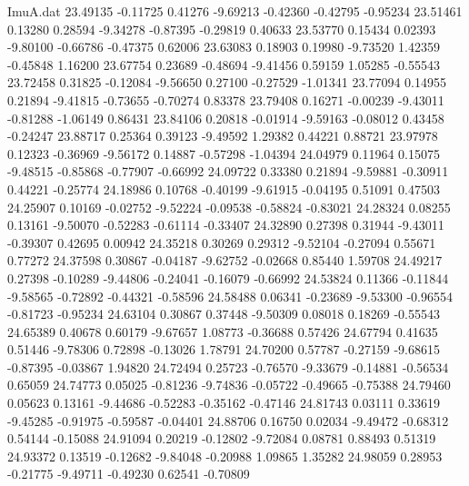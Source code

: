 \begin{filecontents}{ImuA.dat}
  23.49135   -0.11725    0.41276   -9.69213   -0.42360   -0.42795   -0.95234
  23.51461    0.13280    0.28594   -9.34278   -0.87395   -0.29819    0.40633
  23.53770    0.15434    0.02393   -9.80100   -0.66786   -0.47375    0.62006
  23.63083    0.18903    0.19980   -9.73520    1.42359   -0.45848    1.16200
  23.67754    0.23689   -0.48694   -9.41456    0.59159    1.05285   -0.55543
  23.72458    0.31825   -0.12084   -9.56650    0.27100   -0.27529   -1.01341
  23.77094    0.14955    0.21894   -9.41815   -0.73655   -0.70274    0.83378
  23.79408    0.16271   -0.00239   -9.43011   -0.81288   -1.06149    0.86431
  23.84106    0.20818   -0.01914   -9.59163   -0.08012    0.43458   -0.24247
  23.88717    0.25364    0.39123   -9.49592    1.29382    0.44221    0.88721
  23.97978    0.12323   -0.36969   -9.56172    0.14887   -0.57298   -1.04394
  24.04979    0.11964    0.15075   -9.48515   -0.85868   -0.77907   -0.66992
  24.09722    0.33380    0.21894   -9.59881   -0.30911    0.44221   -0.25774
  24.18986    0.10768   -0.40199   -9.61915   -0.04195    0.51091    0.47503
  24.25907    0.10169   -0.02752   -9.52224   -0.09538   -0.58824   -0.83021
  24.28324    0.08255    0.13161   -9.50070   -0.52283   -0.61114   -0.33407
  24.32890    0.27398    0.31944   -9.43011   -0.39307    0.42695    0.00942
  24.35218    0.30269    0.29312   -9.52104   -0.27094    0.55671    0.77272
  24.37598    0.30867   -0.04187   -9.62752   -0.02668    0.85440    1.59708
  24.49217    0.27398   -0.10289   -9.44806   -0.24041   -0.16079   -0.66992
  24.53824    0.11366   -0.11844   -9.58565   -0.72892   -0.44321   -0.58596
  24.58488    0.06341   -0.23689   -9.53300   -0.96554   -0.81723   -0.95234
  24.63104    0.30867    0.37448   -9.50309    0.08018    0.18269   -0.55543
  24.65389    0.40678    0.60179   -9.67657    1.08773   -0.36688    0.57426
  24.67794    0.41635    0.51446   -9.78306    0.72898   -0.13026    1.78791
  24.70200    0.57787   -0.27159   -9.68615   -0.87395   -0.03867    1.94820
  24.72494    0.25723   -0.76570   -9.33679   -0.14881   -0.56534    0.65059
  24.74773    0.05025   -0.81236   -9.74836   -0.05722   -0.49665   -0.75388
  24.79460    0.05623    0.13161   -9.44686   -0.52283   -0.35162   -0.47146
  24.81743    0.03111    0.33619   -9.45285   -0.91975   -0.59587   -0.04401
  24.88706    0.16750    0.02034   -9.49472   -0.68312    0.54144   -0.15088
  24.91094    0.20219   -0.12802   -9.72084    0.08781    0.88493    0.51319
  24.93372    0.13519   -0.12682   -9.84048   -0.20988    1.09865    1.35282
  24.98059    0.28953   -0.21775   -9.49711   -0.49230    0.62541   -0.70809

\end{filecontents}

